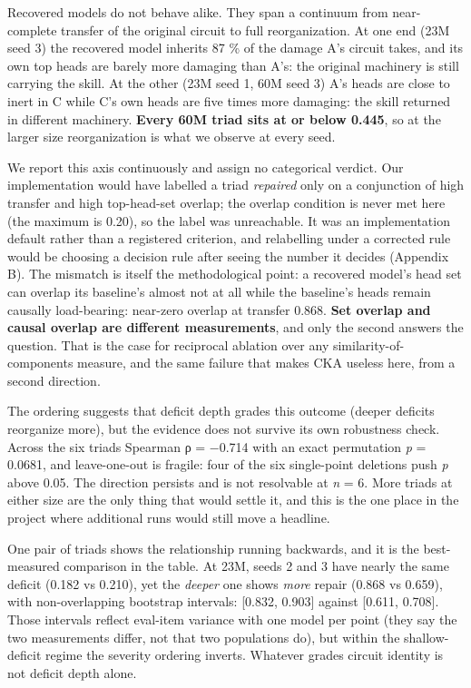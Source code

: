 \documentclass[11pt]{article}
\begin{document}
Recovered models do not behave alike. They span a continuum from near-complete transfer of
the original circuit to full reorganization. At one end (23M seed 3) the recovered model
inherits 87 \% of the damage A's circuit takes, and its own top heads are barely more damaging
than A's: the original machinery is still carrying the skill. At the other (23M seed 1, 60M
seed 3) A's heads are close to inert in C while C's own heads are five times more damaging:
the skill returned in different machinery. \textbf{Every 60M triad sits at or below 0.445}, so at
the larger size reorganization is what we observe at every seed.

We report this axis continuously and assign no categorical verdict. Our implementation would
have labelled a triad \emph{repaired} only on a conjunction of high transfer and high
top-head-set overlap; the overlap condition is never met here (the maximum is 0.20), so the
label was unreachable. It was an implementation default rather than a registered criterion,
and relabelling under a corrected rule would be choosing a decision rule after seeing the
number it decides (Appendix B). The mismatch is itself the methodological point: a recovered
model's head set can overlap its baseline's almost not at all while the baseline's heads
remain causally load-bearing: near-zero overlap at transfer 0.868. \textbf{Set overlap and causal
overlap are different measurements}, and only the second answers the question. That is the
case for reciprocal ablation over any similarity-of-components measure, and the same failure
that makes CKA useless here, from a second direction.

The ordering suggests that deficit depth grades this outcome (deeper deficits reorganize
more), but the evidence does not survive its own robustness check. Across the six triads
Spearman ρ = −0.714 with an exact permutation \emph{p} = 0.0681, and leave-one-out is fragile:
four of the six single-point deletions push \emph{p} above 0.05. The direction persists and is not
resolvable at \emph{n} = 6. More triads at either size are the only thing that would settle it,
and this is the one place in the project where additional runs would still move a headline.

One pair of triads shows the relationship running backwards, and it is the best-measured
comparison in the table. At 23M, seeds 2 and 3 have nearly the same deficit (0.182 vs 0.210),
yet the \emph{deeper} one shows \emph{more} repair (0.868 vs 0.659), with non-overlapping bootstrap
intervals: {[}0.832, 0.903{]} against {[}0.611, 0.708{]}. Those intervals reflect eval-item variance
with one model per point (they say the two measurements differ, not that two populations do), but within the shallow-deficit regime the severity ordering inverts. Whatever grades
circuit identity is not deficit depth alone.
\end{document}
